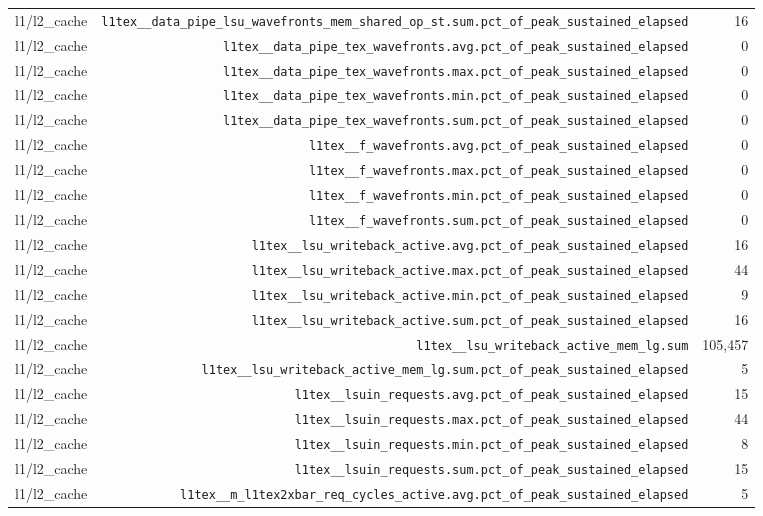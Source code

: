 \begin{table}[h]
\begin{tabular}{|l|r|r|}
l1/l2_cache & \texttt{l1tex__data_pipe_lsu_wavefronts_mem_shared_op_st.sum.pct_of_peak_sustained_elapsed} & 16 \\
l1/l2_cache & \texttt{l1tex__data_pipe_tex_wavefronts.avg.pct_of_peak_sustained_elapsed} & 0 \\
l1/l2_cache & \texttt{l1tex__data_pipe_tex_wavefronts.max.pct_of_peak_sustained_elapsed} & 0 \\
l1/l2_cache & \texttt{l1tex__data_pipe_tex_wavefronts.min.pct_of_peak_sustained_elapsed} & 0 \\
l1/l2_cache & \texttt{l1tex__data_pipe_tex_wavefronts.sum.pct_of_peak_sustained_elapsed} & 0 \\
l1/l2_cache & \texttt{l1tex__f_wavefronts.avg.pct_of_peak_sustained_elapsed} & 0 \\
l1/l2_cache & \texttt{l1tex__f_wavefronts.max.pct_of_peak_sustained_elapsed} & 0 \\
l1/l2_cache & \texttt{l1tex__f_wavefronts.min.pct_of_peak_sustained_elapsed} & 0 \\
l1/l2_cache & \texttt{l1tex__f_wavefronts.sum.pct_of_peak_sustained_elapsed} & 0 \\
l1/l2_cache & \texttt{l1tex__lsu_writeback_active.avg.pct_of_peak_sustained_elapsed} & 16 \\
l1/l2_cache & \texttt{l1tex__lsu_writeback_active.max.pct_of_peak_sustained_elapsed} & 44 \\
l1/l2_cache & \texttt{l1tex__lsu_writeback_active.min.pct_of_peak_sustained_elapsed} & 9 \\
l1/l2_cache & \texttt{l1tex__lsu_writeback_active.sum.pct_of_peak_sustained_elapsed} & 16 \\
l1/l2_cache & \texttt{l1tex__lsu_writeback_active_mem_lg.sum} & 105,457 \\
l1/l2_cache & \texttt{l1tex__lsu_writeback_active_mem_lg.sum.pct_of_peak_sustained_elapsed} & 5 \\
l1/l2_cache & \texttt{l1tex__lsuin_requests.avg.pct_of_peak_sustained_elapsed} & 15 \\
l1/l2_cache & \texttt{l1tex__lsuin_requests.max.pct_of_peak_sustained_elapsed} & 44 \\
l1/l2_cache & \texttt{l1tex__lsuin_requests.min.pct_of_peak_sustained_elapsed} & 8 \\
l1/l2_cache & \texttt{l1tex__lsuin_requests.sum.pct_of_peak_sustained_elapsed} & 15 \\
l1/l2_cache & \texttt{l1tex__m_l1tex2xbar_req_cycles_active.avg.pct_of_peak_sustained_elapsed} & 5 \\

\end{tabular}
\end{table}
